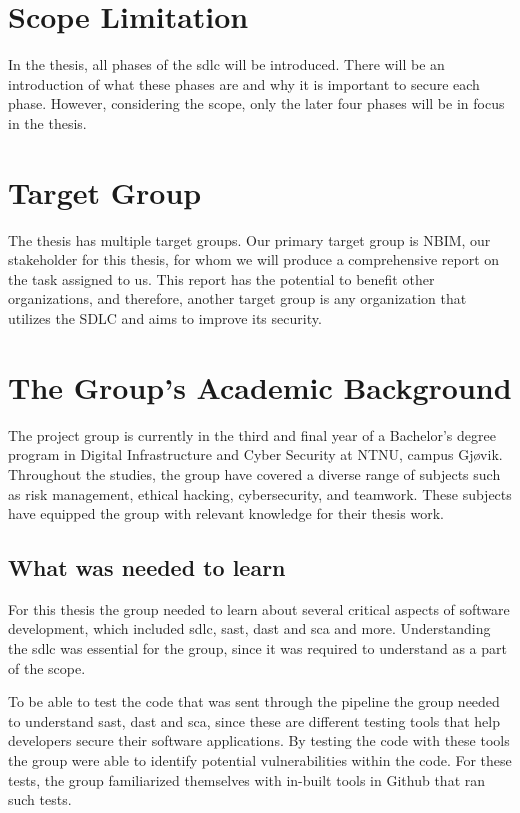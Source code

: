 \section{Scope Limitation}
In the thesis, all phases of the \acrlong{sdlc} will be introduced. There will be an introduction of what these phases are and why it is important to secure each phase. However, considering the scope, only the later four phases will be in focus in the thesis. 

\section{Target Group}
The thesis has multiple target groups. Our primary target group is NBIM, our stakeholder for this thesis, for whom we will produce a comprehensive report on the task assigned to us. This report has the potential to benefit other organizations, and therefore, another target group is any organization that utilizes the SDLC and aims to improve its security.

\section{The Group’s Academic Background}
The project group is currently in the third and final year of a Bachelor's degree program in Digital Infrastructure and Cyber Security at NTNU, campus Gjøvik. Throughout the studies, the group have covered a diverse range of subjects such as risk management, ethical hacking, cybersecurity, and teamwork. These subjects have equipped the group with relevant knowledge for their thesis work.

\subsection{What was needed to learn}%
For this thesis the group needed to learn about several critical aspects of software development, which included  \acrshort{sdlc}, \acrlong{sast}, \acrlong{dast} and \acrlong{sca} and more. Understanding the \acrshort{sdlc} was essential for the group, since it was required to understand as a part of the scope. 

To be able to test the code that was sent through the pipeline the group needed to understand \acrshort{sast}, \acrshort{dast} and \acrshort{sca}, since these are different testing tools that help developers secure their software applications. By testing the code with these tools the group were able to identify potential vulnerabilities within the code. For these tests, the group familiarized themselves with in-built tools in Github that ran such tests. 

